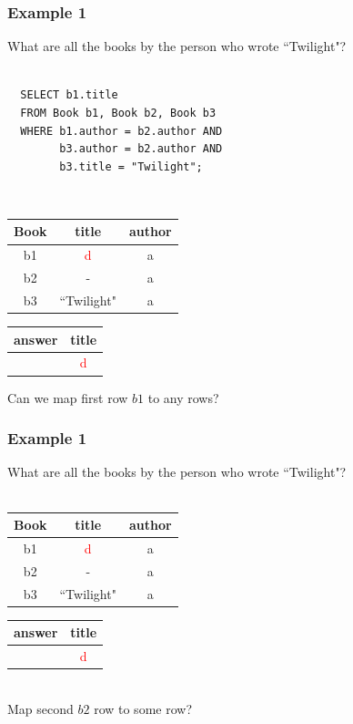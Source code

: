 \documentclass{beamer}
\begin{document}
\begin{frame}[fragile]
  \frametitle{Example 1}
  What are all the books by the person who wrote ``Twilight"?\\
  \hfill \\
\begin{verbatim} 
  SELECT b1.title
  FROM Book b1, Book b2, Book b3
  WHERE b1.author = b2.author AND
        b3.author = b2.author AND
        b3.title = "Twilight";
\end{verbatim}
  \hfill \\
  \begin{tabular}{ c | c c }
  Book & title & author \\
  \hline
   b1 & \textcolor{red}{d} & a \\
   b2 & -         & a \\
   b3 & ``Twilight" & a \\
  \end{tabular}
  \begin{tabular}{ c | c}
  answer & title \\
  \hline
   & \textcolor{red}{d}\\
  \end{tabular}

  Can we map first row $b1$ to any rows?
\end{frame}

\begin{frame}
  \frametitle{Example 1}
  What are all the books by the person who wrote ``Twilight"?\\
  \hfill \\
  \begin{tabular}{ c | c c }
  Book & title & author \\
  \hline
   b1 & \textcolor{red}{d} & a \\
   b2 & -         & a \\
   b3 & ``Twilight" & a \\
  \end{tabular}
  \begin{tabular}{ c | c}
  answer & title \\
  \hline
   & \textcolor{red}{d}\\
  \end{tabular}
  \hfill \\
  Map second $b2$ row to some row?
\end{frame}
\end{document}
